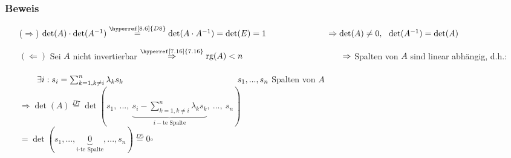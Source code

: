 \documentclass[a4paper, 12pt,titlepage, pdf, headsepline]{scrartcl}
\newcommand{\rg}{\textrm{rg}}
\newcommand{\qed}{\hfill$\square$}
\renewcommand{\>}{\rightarrow}
\renewcommand{\*}{\cdot}
\begin{document}
\subsubsection*{Beweis}
\begin{itemize}
	\item[($\Rightarrow$)] $\det(A) \cdot \det(A^{-1}) \overset{\hyperref[8.6]{D8}}{=} \det(A \cdot A^{-1}) = \det(E) = 1\\
	\noindent\hspace*{25mm} \Rightarrow \det(A) \neq 0 ,~~ \det(A^{-1}) = \det(A)$
	\item[$(\Leftarrow)$] Sei $A$ nicht invertierbar $\overset{\hyperref[7.16]{7.16}}{\Rightarrow} \rg(A) < n \\
	\noindent\hspace*{40.5mm}\Rightarrow$ Spalten von $A$ sind linear abhängig, d.h.:\\
	\\
	\noindent\hspace*{40.5mm}$\qquad\exists i: s_i = \sum_{k = 1, k\neq i}^{n} \lambda_k s_k\\\noindent\hspace*{40.5mm}\qquad s_1,...,s_n$ Spalten von $A$ \\
	\noindent\hspace*{40.5mm}$\Rightarrow \det(A) \overset{\hyperref[8.6]{D7}}{=} \det(s_1,~...,~\underbrace{s_i - \sum_{k = 1, k\neq i}^{n} \lambda_k s_k}_{i-\text{te Spalte}},~...,~s_n)$\\
	\noindent\hspace*{57.5mm}$= \det(s_1,...,\underbrace{0}_{i\text{-te Spalte}},...,s_n) \overset{\hyperref[8.6]{D5}}{=} 0$\qed
\end{itemize}
\end{document}
